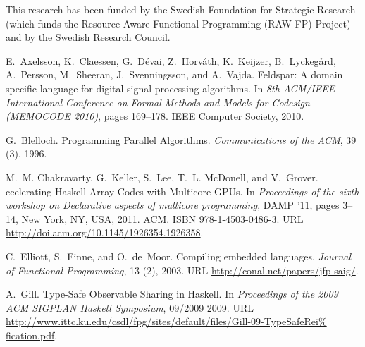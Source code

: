 \documentclass{sigplanconf}
\begin{document}
This research has been funded by the Swedish Foundation for
Strategic Research (which funds the Resource Aware Functional 
Programming (RAW FP) Project) and by the
Swedish Research Council.







\begin{thebibliography}{}
\softraggedright
{}
E.~Axelsson, K.~Claessen, G.~D{\'e}vai, Z.~Horv{\'a}th, K.~Keijzer,
  B.~Lyckeg{\aa}rd, A.~Persson, M.~Sheeran, J.~Svenningsson, and A.~Vajda.
\newblock Feldspar: {A} domain specific language for digital signal processing
  algorithms.
\newblock In \emph{8th ACM/IEEE International Conference on Formal Methods and
  Models for Codesign (MEMOCODE 2010)}, pages 169--178. IEEE Computer Society,
  2010.

G.~Blelloch.
\newblock Programming {P}arallel {A}lgorithms.
\newblock \emph{Communications of the ACM}, 39 (3), 1996.

M.~M. Chakravarty, G.~Keller, S.~Lee, T.~L. McDonell, and V.~Grover.
ccelerating {H}askell {A}rray {C}odes with {M}ulticore {GPU}s.
\newblock In \emph{Proceedings of the sixth workshop on Declarative aspects of
  multicore programming}, DAMP '11, pages 3--14, New York, NY, USA, 2011. ACM.
\newblock ISBN 978-1-4503-0486-3.
\newblock URL \url{http://doi.acm.org/10.1145/1926354.1926358}.

C.~Elliott, S.~Finne, and O.~de~Moor.
\newblock Compiling embedded languages.
\newblock \emph{Journal of Functional Programming}, 13 (2), 2003.
\newblock URL \url{http://conal.net/papers/jfp-saig/}.

A.~Gill.
\newblock Type-{S}afe {O}bservable {S}haring in {H}askell.
\newblock In \emph{Proceedings of the 2009 ACM SIGPLAN Haskell Symposium},
  09/2009 2009.
\newblock URL
  \url{http://www.ittc.ku.edu/csdl/fpg/sites/default/files/Gill-09-TypeSafeRei%
fication.pdf}.


\end{thebibliography}
\end{document}
